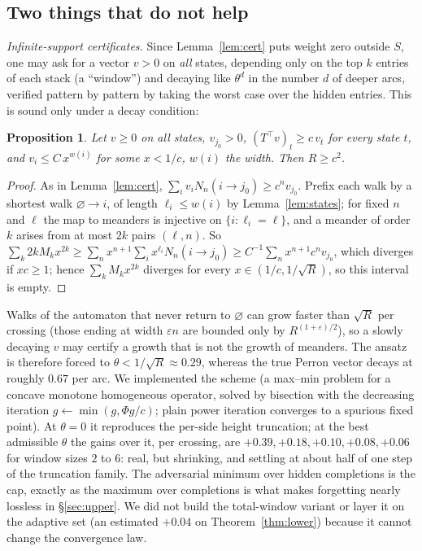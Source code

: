 \documentclass[11pt]{amsart}
\newtheorem{proposition}[theorem]{Proposition}
\theoremstyle{definition}
\newcommand{\ttop}{^{\!\top}}
\begin{document}
\subsection{Two things that do not help}\label{sub:lowertried}
\emph{Infinite-support certificates.} Since Lemma~\ref{lem:cert} puts weight zero outside $S$, one may ask for a vector $v>0$ on \emph{all} states, depending only on the top $k$ entries of each stack (a ``window'') and decaying like $\theta^{d}$ in the number $d$ of deeper arcs, verified pattern by pattern by taking the worst case over the hidden entries. This is sound only under a decay condition:

\begin{proposition}\label{prop:window}
Let $v\ge0$ on all states, $v_{j_0}>0$, $(T\ttop v)_t\ge c\,v_t$ for every state $t$, and $v_i\le C\,x^{w(i)}$ for some $x<1/c$, $w(i)$ the width. Then $R\ge c^2$.
\end{proposition}

\begin{proof}
As in Lemma~\ref{lem:cert}, $\sum_iv_iN_n(i\to j_0)\ge c^nv_{j_0}$. Prefix each walk by a shortest walk $\varnothing\to i$, of length $\ell_i\le w(i)$ by Lemma~\ref{lem:states}; for fixed $n$ and $\ell$ the map to meanders is injective on $\{i:\ell_i=\ell\}$, and a meander of order $k$ arises from at most $2k$ pairs $(\ell,n)$. So $\sum_k2kM_kx^{2k}\ge\sum_nx^{n+1}\sum_ix^{\ell_i}N_n(i\to j_0)\ge C^{-1}\sum_nx^{n+1}c^nv_{j_0}$, which diverges if $xc\ge1$; hence $\sum_kM_kx^{2k}$ diverges for every $x\in(1/c,1/\sqrt R)$, so this interval is empty.
\end{proof}

Walks of the automaton that never return to $\varnothing$ can grow faster than $\sqrt R$ per crossing (those ending at width $\varepsilon n$ are bounded only by $R^{(1+\varepsilon)/2}$), so a slowly decaying $v$ may certify a growth that is not the growth of meanders. The ansatz is therefore forced to $\theta<1/\sqrt R\approx0.29$, whereas the true Perron vector decays at roughly $0.67$ per arc. We implemented the scheme (a max--min problem for a concave monotone homogeneous operator, solved by bisection with the decreasing iteration $g\leftarrow\min(g,\Phi g/c)$; plain power iteration converges to a spurious fixed point). At $\theta=0$ it reproduces the per-side height truncation; at the best admissible $\theta$ the gains over it, per crossing, are $+0.39,+0.18,+0.10,+0.08,+0.06$ for window sizes $2$ to $6$: real, but shrinking, and settling at about half of one step of the truncation family. The adversarial minimum over hidden completions is the cap, exactly as the maximum over completions is what makes forgetting nearly lossless in \S\ref{sec:upper}. We did not build the total-window variant or layer it on the adaptive set (an estimated $+0.04$ on Theorem~\ref{thm:lower}) because it cannot change the convergence law.
\end{document}
